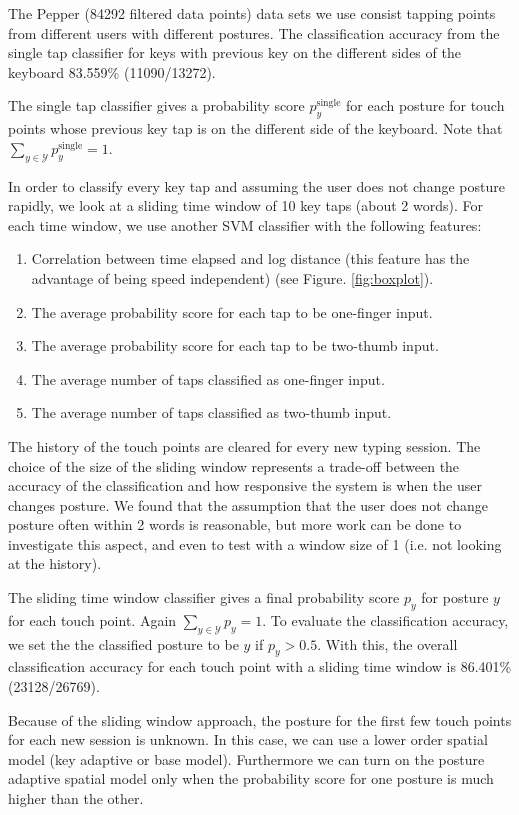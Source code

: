 \documentclass{sigchi}
\begin{document}
The Pepper (84292 filtered data points) data sets we use consist tapping points 
from different users with different postures. The classification accuracy from
the single tap classifier for keys with previous key on the different sides of
the keyboard 83.559\% (11090/13272).

The single tap classifier gives a probability score $p_y^{\text{single}}$ for each posture for touch
points whose previous key tap is on the different side of the keyboard. Note that
$\displaystyle\sum_{y \in \mathcal{Y}}p_y^{\text{single}} = 1$.
 
In order to classify every key tap and assuming the user does not change posture 
rapidly, we look at a sliding time window of 10 key taps (about 2 words). For 
each time window, we use another SVM classifier with the following features:
\begin{enumerate}
\item Correlation between time elapsed and log distance (this feature has the
advantage of being speed independent) (see Figure. \ref{fig:boxplot}).
\item The average probability score for each tap to be one-finger input.
\item The average probability score for each tap to be two-thumb input.
\item The average number of taps classified as one-finger input.
\item The average number of taps classified as two-thumb input.
\end{enumerate}
The history of the touch points are cleared for every new typing session.
The choice of the size of the sliding window represents a trade-off between the 
accuracy of the classification and how responsive the system is when the user
changes posture. We found that the assumption that the user does not change posture
often within 2 words is reasonable, but more work can be done to investigate this
aspect, and even to test with a window size of 1 (i.e. not 
looking at the history).

The sliding time window classifier gives a final probability score $p_y$ for posture
$y$ for each touch point. Again $\displaystyle\sum_{y\in \mathcal{Y}}p_y = 1$. To evaluate the classification accuracy, we set the the
classified posture to be $y$ if $p_y > 0.5$. With this, the overall classification 
accuracy for each touch point with a sliding time window
is 86.401\% (23128/26769).

Because of the sliding window approach, the posture for the first few touch points  
for each new session is unknown. In this case, we can use a lower order spatial 
model (key adaptive or base model). Furthermore  we can turn on the posture 
adaptive spatial model only when the probability score for one posture is much 
higher than the other.
\end{document}
